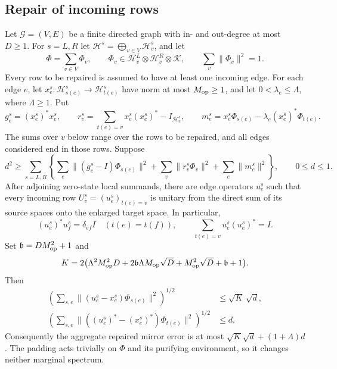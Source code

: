 \subsection{Repair of incoming rows}
\begin{lemma}\label{rnd:lem:row-repair}
Let $\mathcal G=(V,E)$ be a finite directed graph with in- and out-degree at most $D\ge1$. For $s=L,R$ let $\mathcal H^s=\bigoplus_{v\in V}\mathcal H_v^s$, and let
\[
 \Phi=\sum_{v\in V}\Phi_v,\qquad
 \Phi_v\in\mathcal H_v^L\otimes\mathcal H_v^R\otimes\mathcal K,
 \qquad\sum_v\|\Phi_v\|^2=1.
\]
Every row to be repaired is assumed to have at least one incoming edge. For each edge $e$, let $x_e^s:\mathcal H_{s(e)}^s\to\mathcal H_{t(e)}^s$ have norm at most $M_{\rm op}\ge1$, and let $0<\lambda_e\le\Lambda$, where $\Lambda\ge1$. Put
\[
 g_e^s=(x_e^s)^*x_e^s,\qquad
 r_v^s=\sum_{t(e)=v}x_e^s(x_e^s)^*-I_{\mathcal H_v^s},\qquad
 m_e^s=x_e^s\Phi_{s(e)}-\lambda_e(x_e^{\bar s})^*\Phi_{t(e)}.
\]
The sums over $v$ below range over the rows to be repaired, and all edges considered end in those rows. Suppose
\[
 d^2\ge\sum_{s=L,R}\left\{
 \sum_e\|(g_e^s-I)\Phi_{s(e)}\|^2+
 \sum_v\|r_v^s\Phi_v\|^2+
 \sum_e\|m_e^s\|^2\right\},\qquad 0\le d\le1.
\]
After adjoining zero-state local summands, there are edge operators $u_e^s$ such that every incoming row $U_v^s=(u_e^s)_{t(e)=v}$ is unitary from the direct sum of its source spaces onto the enlarged target space. In particular,
\[
 (u_e^s)^*u_f^s=\delta_{ef}I\quad(t(e)=t(f)),\qquad
 \sum_{t(e)=v}u_e^s(u_e^s)^*=I.
\]
Set $\mathfrak b=DM_{\rm op}^2+1$ and
\[
 K=2\bigl(\Lambda^2M_{\rm op}^2D+2\mathfrak b\Lambda M_{\rm op}\sqrt D+M_{\rm op}^2\sqrt D+\mathfrak b+1\bigr).
\]
Then
\begin{align*}
 \left(\sum_{s,e}\|(u_e^s-x_e^s)\Phi_{s(e)}\|^2\right)^{1/2}&\le\sqrt K\,\sqrt d,\\
 \left(\sum_{s,e}\|((u_e^s)^*-(x_e^s)^*)\Phi_{t(e)}\|^2\right)^{1/2}&\le d.
\end{align*}
Consequently the aggregate repaired mirror error is at most $\sqrt K\sqrt d+(1+\Lambda)d$. The padding acts trivially on $\Phi$ and its purifying environment, so it changes neither marginal spectrum.
\end{lemma}

